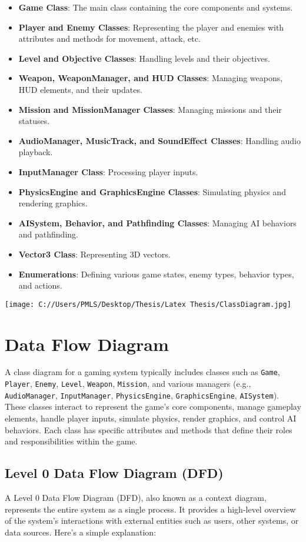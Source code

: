 \begin{itemize}
	\item \textbf{Game Class}: The main class containing the core components and systems.
	\item \textbf{Player and Enemy Classes}: Representing the player and enemies with attributes and methods for movement, attack, etc.
	\item \textbf{Level and Objective Classes}: Handling levels and their objectives.
	\item \textbf{Weapon, WeaponManager, and HUD Classes}: Managing weapons, HUD elements, and their updates.
	\item \textbf{Mission and MissionManager Classes}: Managing missions and their statuses.
	\item \textbf{AudioManager, MusicTrack, and SoundEffect Classes}: Handling audio playback.
	\item \textbf{InputManager Class}: Processing player inputs.
	\item \textbf{PhysicsEngine and GraphicsEngine Classes}: Simulating physics and rendering graphics.
	\item \textbf{AISystem, Behavior, and Pathfinding Classes}: Managing AI behaviors and pathfinding.
	\item \textbf{Vector3 Class}: Representing 3D vectors.
	\item \textbf{Enumerations}: Defining various game states, enemy types, behavior types, and actions.
\end{itemize}

\texttt{[image: C://Users/PMLS/Desktop/Thesis/Latex Thesis/ClassDiagram.jpg]}

\section{Data Flow Diagram}
A class diagram for a gaming system typically includes classes such as \texttt{Game}, \texttt{Player}, \texttt{Enemy}, \texttt{Level}, \texttt{Weapon}, \texttt{Mission}, and various managers (e.g., \texttt{AudioManager}, \texttt{InputManager}, \texttt{PhysicsEngine}, \texttt{GraphicsEngine}, \texttt{AISystem}). These classes interact to represent the game's core components, manage gameplay elements, handle player inputs, simulate physics, render graphics, and control AI behaviors. Each class has specific attributes and methods that define their roles and responsibilities within the game.

\subsection{Level 0 Data Flow Diagram (DFD)}
A Level 0 Data Flow Diagram (DFD), also known as a context diagram, represents the entire system as a single process. It provides a high-level overview of the system's interactions with external entities such as users, other systems, or data sources. Here’s a simple explanation:

